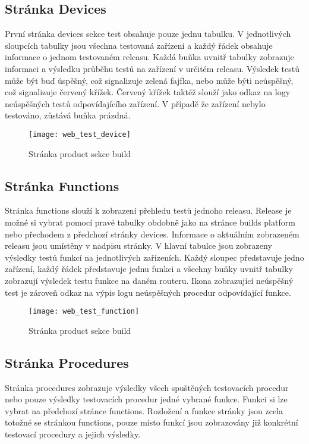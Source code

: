 \subsection{Stránka Devices}
První stránka devices sekce test obsahuje pouze jednu tabulku. V jednotlivých sloupcích tabulky jsou všechna testovaná zařízení a každý řádek obsahuje informace o jednom testovaném releasu. Každá buňka uvnitř tabulky zobrazuje informaci a výsledku průběhu testů na zařízení v určitém releasu. Výsledek testů může být buď úspěšný, což signalizuje zelená fajfka, nebo může býti neúspěšný, což signalizuje červený křížek. Červený křížek taktéž slouží jako odkaz na logy neúspěšných testů odpovídajícího zařízení. V případě že zařízení nebylo testováno, zůstává buňka prázdná.

\begin{figure}[h]
  \centering
  \texttt{[image: web\_test\_device]}
  \caption{Stránka product sekce build}
  \label{fig:web_test_device}
\end{figure}

\subsection{Stránka Functions}
Stránka functions slouží k zobrazení přehledu testů jednoho releasu. Release je možné si vybrat pomocí pravé tabulky obdobně jako na stránce builds platform nebo přechodem z předchozí stránky devices. Informace o aktuálním zobrazeném releasu jsou umístěny v nadpisu stránky. V hlavní tabulce jsou zobrazeny výsledky testů funkcí na jednotlivých zařízeních. Každý sloupec představuje jedno zařízení, každý řádek představuje jednu funkci a všechny buňky uvnitř tabulky zobrazují výsledek testu funkce na daném routeru. Ikona zobrazující neúspěšný test je zároveň odkaz na výpis logu neúspěšných procedur odpovídající funkce.

\begin{figure}[h]
  \centering
  \texttt{[image: web\_test\_function]}
  \caption{Stránka product sekce build}
  \label{fig:web_test_device}
\end{figure}

\subsection{Stránka Procedures}
Stránka procedures zobrazuje výsledky všech spuštěných testovacích procedur nebo pouze výsledky testovacích procedur jedné vybrané funkce. Funkci si lze vybrat na předchozí stránce functions. Rozložení a funkce stránky jsou zcela totožné se stránkou functions, pouze místo funkcí jsou zobrazovány již konkrétní testovací procedury a jejich výsledky.

